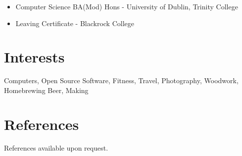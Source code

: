 \documentclass[a4paper, 10pt] {article}
\begin{document}
\begin{itemize}[itemsep=2pt,parsep=2pt]
  \item Computer Science BA(Mod) Hons - University of Dublin, Trinity College
  \item Leaving Certificate - Blackrock College
\end{itemize}

\section*{Interests}

Computers, Open Source Software, Fitness, Travel, Photography, Woodwork, Homebrewing Beer, Making

\section*{References}

References available upon request.
\end{document}
